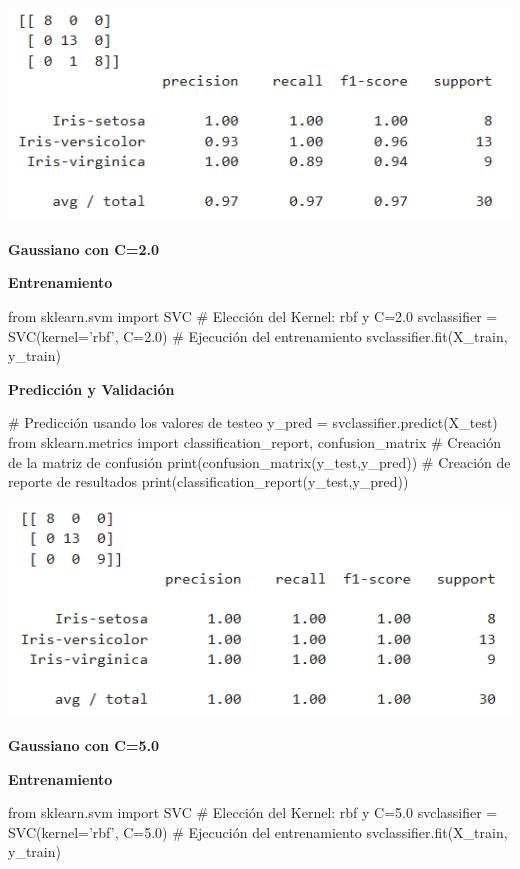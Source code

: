 \documentclass[paper=a4, fontsize=11pt]{scrartcl}
\numberwithin{equation}{section}		%
\numberwithin{figure}{section}			%
\numberwithin{table}{section}				%
\begin{document}
    \includegraphics[scale=0.8]{gaussiano_c_10}
    \newpage
    
     \textbf{Gaussiano con C=2.0}
    
    \textbf{Entrenamiento}
    
    \begin{python}
    from sklearn.svm import SVC
    # Elección del Kernel: rbf y C=2.0
    svclassifier = SVC(kernel='rbf', C=2.0)
    # Ejecución del entrenamiento
    svclassifier.fit(X_train, y_train)
    \end{python}

    \textbf{Predicción y Validación}
    
    \begin{python}
    # Predicción usando los valores de testeo
    y_pred = svclassifier.predict(X_test)
    from sklearn.metrics import classification_report, confusion_matrix
    # Creación de la matriz de confusión
    print(confusion_matrix(y_test,y_pred))
    # Creación de reporte de resultados
    print(classification_report(y_test,y_pred))
    \end{python}
    
    \includegraphics[scale=0.8]{gaussiano_c_20}
    \newpage
    
     \textbf{Gaussiano con C=5.0}
    
    \textbf{Entrenamiento}
    
    \begin{python}
    from sklearn.svm import SVC
    # Elección del Kernel: rbf y C=5.0
    svclassifier = SVC(kernel='rbf', C=5.0)
    # Ejecución del entrenamiento
    svclassifier.fit(X_train, y_train)
    \end{python}
\end{document}
